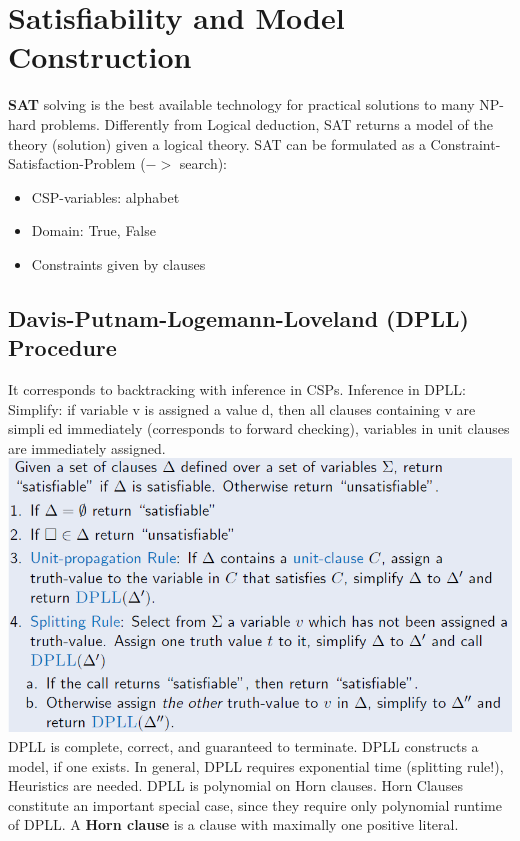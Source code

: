 \documentclass{article}
\begin{document}
\section{Satisfiability and Model Construction}
\textbf{SAT} solving is the best available technology for practical solutions to many NP-hard problems. Differently from Logical deduction, SAT returns a model of the theory (solution) given a logical theory. SAT can be formulated as a Constraint-Satisfaction-Problem ($->$ search):\\
\begin{itemize}
\item CSP-variables: alphabet\\
\item Domain: {True, False}\\
\item Constraints given by clauses\\
\end{itemize}
\subsection{Davis-Putnam-Logemann-Loveland (DPLL) Procedure}
It corresponds to backtracking with inference in CSPs. Inference in DPLL:\\
Simplify: if variable v is assigned a value d, then all clauses containing v
are simplied immediately (corresponds to forward checking), variables in unit clauses are immediately assigned.\\
\includegraphics[scale=0.6]{36.png}\\
DPLL is complete, correct, and guaranteed to terminate. DPLL constructs a model, if one exists. In general, DPLL requires exponential time (splitting rule!), Heuristics are needed. DPLL is polynomial on Horn clauses. Horn Clauses constitute an important special case, since they require only polynomial runtime of DPLL. A \textbf{Horn clause }is a clause with maximally one positive literal.\\
\end{document}
